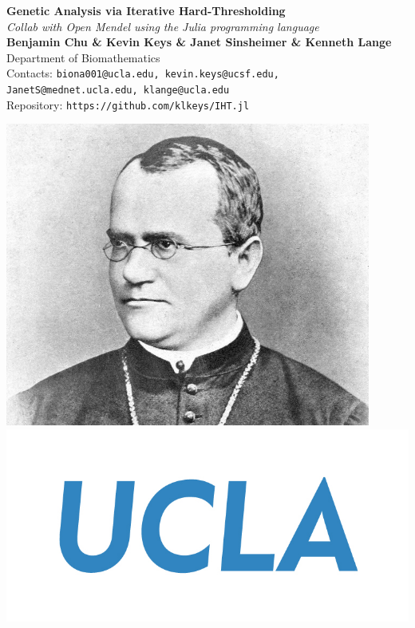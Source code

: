 \documentclass[a0,portrait]{a0poster}
\begin{document}


\begin{minipage}[b]{0.80\linewidth}
\veryHuge \color{NavyBlue} \textbf{Genetic Analysis via Iterative Hard-Thresholding}\\ \color{Black} %
\Huge\textit{Collab with Open Mendel using the Julia programming language}\\[2cm] %
\huge \textbf{Benjamin Chu \& Kevin Keys \& Janet Sinsheimer \& Kenneth Lange}\\[0.5cm] %
\huge Department of Biomathematics\\[0.4cm]
\normalsize 
Contacts: \texttt{biona001@ucla.edu, kevin.keys@ucsf.edu, JanetS@mednet.ucla.edu,  klange@ucla.edu} \\
Repository: \texttt{https://github.com/klkeys/IHT.jl} \\
\end{minipage}
%
\begin{minipage}[b]{0.25\linewidth}
\centering
\includegraphics[width=12cm]{figures/gregor-mendel-3.jpg}
\includegraphics[width=15cm]{figures/ucla-std-blu-cmyk.jpg}
\end{minipage}
\end{document}

